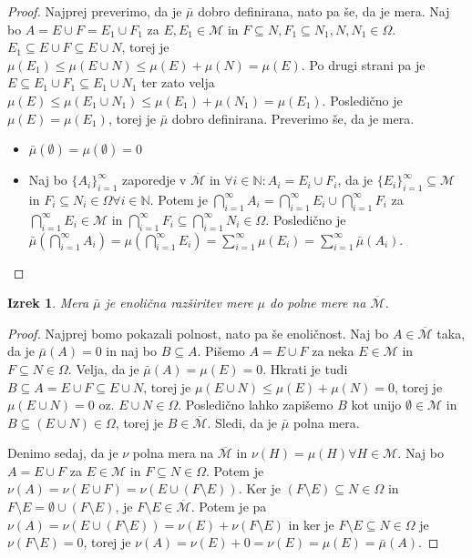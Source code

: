 \documentclass[a4paper, 10pt]{article}
\newtheorem{izr}{Izrek}
\newcommand{\mth}[1]{\ensuremath{\mathbb{#1}}}
\newcommand{\N}{\mth{N}}
\newcommand{\Mu}{\mathcal{M}}
\begin{document}
		\begin{proof}
			Najprej preverimo, da je $\bar{\mu}$ dobro definirana, nato pa še, da je mera. Naj bo $A = E\cup F = E_1\cup F_1$ za $E, E_1\in \Mu$ in $F\subseteq N, F_1 \subseteq N_1, N, N_1 \in \Omega$. $E_1 \subseteq E\cup F \subseteq E\cup N$, torej je $\mu(E_1) \leq \mu(E\cup N) \leq \mu(E) + \mu(N) = \mu(E)$. Po drugi strani pa je $E \subseteq E_1\cup F_1 \subseteq E_1 \cup N_1$ ter zato velja $\mu(E) \leq \mu(E_1\cup N_1) \leq \mu(E_1) + \mu(N_1) = \mu(E_1)$. Posledično je $\mu(E) = \mu(E_1)$, torej je $\bar{\mu}$ dobro definirana. Preverimo še, da je mera.
			\begin{itemize}
				\item $\bar{\mu}(\emptyset) = \mu(\emptyset) = 0$
				\item Naj bo $\{A_i\}_{i = 1}^{\infty}$ zaporedje v $\overline{\Mu}$ in $\forall i \in \N: A_i = E_i\cup F_i$, da je $\{E_i\}_{i = 1}^\infty \subseteq \Mu$ in $F_i \subseteq N_i \in \Omega \forall i\in \N$. Potem je $\bigcap_{i = 1}^\infty A_i = \bigcap_{i = 1}^\infty E_i \cup \bigcap_{i = 1}^\infty F_i$ za $\bigcap_{i = 1}^\infty E_i \in \Mu$ in $\bigcap_{i = 1}^\infty F_i \subseteq \bigcap_{i = 1}^\infty N_i \in \Omega$. Posledično je $\bar{\mu}(\bigcap_{i = 1}^\infty A_i) = \mu(\bigcap_{i = 1}^\infty E_i) = \sum_{i = 1}^\infty \mu(E_i) = \sum_{i = 1}^\infty \bar{\mu}(A_i)$.
			\end{itemize}
		\end{proof}
		\begin{izr}
			Mera $\bar{\mu}$ je enolična razširitev mere $\mu$ do polne mere na $\overline{\Mu}$.
		\end{izr}
		\begin{proof}
			Najprej bomo pokazali polnost, nato pa še enoličnost. Naj bo $A\in \overline{\Mu}$ taka, da je $\bar{\mu}(A) = 0$ in naj bo $B\subseteq A$. Pišemo $A = E\cup F$ za neka $E\in \Mu$ in $F\subseteq N \in \Omega$. Velja, da je $\bar{\mu}(A) = \mu(E) = 0$. Hkrati je tudi $B\subseteq A = E\cup F \subseteq E\cup N$, torej je $\mu(E\cup N) \leq \mu(E) + \mu(N) = 0$, torej je $\mu(E\cup N) = 0$ oz. $E\cup N \in \Omega$. Posledično lahko zapišemo $B$ kot unijo $\emptyset\in\Mu$ in $B\subseteq (E\cup N) \in \Omega$, torej je $B\in \overline{\Mu}$. Sledi, da je $\bar{\mu}$ polna mera.
			
			Denimo sedaj, da je $\nu$ polna mera na $\overline{\Mu}$ in $\nu(H) = \mu(H) \forall H\in \Mu$. Naj bo $A = E\cup F$ za $E\in\Mu$ in $F\subseteq N \in\Omega$. Potem je $\nu(A) = \nu(E\cup F) = \nu(E\cup (F\setminus E))$. Ker je $(F\setminus E) \subseteq N\in\Omega$ in $F\setminus E = \emptyset \cup (F\setminus E)$, je $F\setminus E \in \overline{\Mu}$. Potem je pa $\nu(A) = \nu(E\cup (F\setminus E)) = \nu(E) + \nu(F\setminus E)$ in ker je $F\setminus E \subseteq N\in\Omega$ je $\nu(F\setminus E) = 0$, torej je $\nu(A)= \nu(E) + 0 =\nu(E) = \mu(E) = \bar{\mu}(A)$.
		\end{proof}
\end{document}
